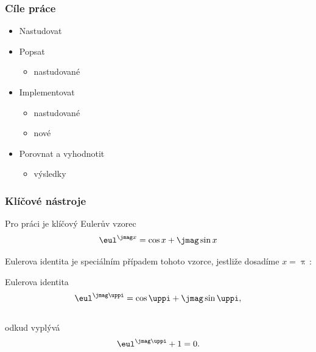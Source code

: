 \documentclass[%
  12pt,       				%
	t,                  %
	aspectratio=1610,   %
	unicode,						%
]{beamer}				    	%
\begin{document}
\disablenavigationsymbols

\maketitle

\begin{frame} 
	\frametitle{Cíle práce}
	\begin{itemize}
			\item Nastudovat
			\item Popsat
				\begin{itemize}
					\item nastudované
				\end{itemize}
			\item Implementovat
				\begin{itemize}
					\item nastudované
					\item nové
				\end{itemize}
			\item Porovnat a vyhodnotit
				\begin{itemize}
						\item výsledky
				\end{itemize}
	\end{itemize}
\end{frame}


\begin{frame} 
	\frametitle{Klíčové nástroje}

	\begin{alertblock}{Pro práci je klíčový Eulerův vzorec}
		$$\eul^{\jmag x}=\cos x + \jmag\sin x$$
	\end{alertblock}

	\vspace{4ex}
	Eulerova identita je speciálním případem tohoto vzorce, jestliže dosadíme $x=\uppi$\,:

	\begin{block}{Eulerova identita}
		$$\eul^{\jmag \uppi}=\cos \uppi + \jmag\sin \uppi,$$\\
		odkud vyplývá
		$$\eul^{\jmag \uppi}+1=0.$$
	\end{block}
\end{frame} 
\end{document}
